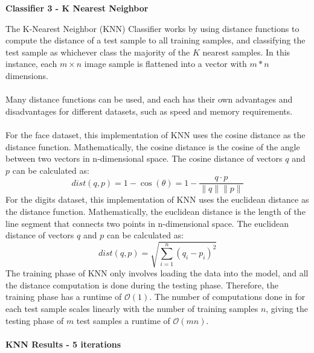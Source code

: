 \documentclass[11pt]{article}
\begin{document}
    \begin{center}
        \Large
        \textbf{Classifier 3 - K Nearest Neighbor}
    \end{center}
    \normalsize
    The K-Nearest Neighbor (KNN) Classifier works by using distance functions to compute
    the distance of a test sample to all training samples, and classifying the test sample
    as whichever class the majority of the $K$ nearest samples.
    In this instance, each $m \times n$ image sample is flattened into a vector with $m*n$ dimensions.\\\\
    Many distance functions can be used, and each has their own advantages and disadvantages for
    different datasets, such as speed and memory requirements.\\\\
    For the face dataset, this implementation of KNN uses the cosine distance as the distance function.
    Mathematically, the cosine distance is the cosine of the angle between two vectors in n-dimensional space.
    The cosine distance of vectors $q$ and $p$ can be calculated as:
    \[dist\left(q, p\right) = 1-\cos(\theta) = 1-\frac{q \cdot p}{\|q\|\|p\|}\]
    For the digits dataset, this implementation of KNN uses the euclidean distance as the distance function.
    Mathematically, the euclidean distance is the length of the line segment that connects two points in n-dimensional space.
    The euclidean distance of vectors $q$ and $p$ can be calculated as:
    \[dist\left(q, p\right) = \sqrt{\sum_{i=1}^{n}\left(q_i-p_i\right)^2}\]
    The training phase of KNN only involves loading the data into the model, and all the distance computation
    is done during the testing phase.
    Therefore, the training phase has a runtime of $\mathcal{O}(1)$.
    The number of computations done in for each test sample scales linearly with the number
    of training samples $n$, giving the testing phase of $m$ test samples a runtime of $\mathcal{O}(mn)$.\\\\
    \large
    \textbf{KNN Results - 5 iterations}
    \small
\end{document}
